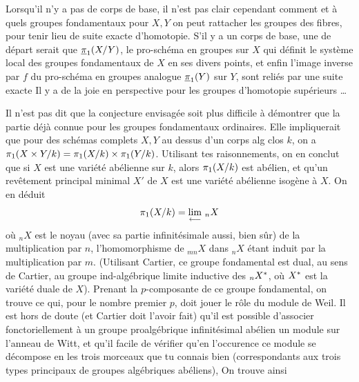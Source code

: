 Lorsqu'il n'y a pas de corps de base, il n'est pas clair cependant
comment et à quels groupes fondamentaux  pour $X,Y$ on peut
rattacher  les groupes  des fibres,
pour tenir lieu de suite exacte d'homotopie. S'il y a un corps de
base, une   de départ serait que  $\underline\pi_1(X/Y)$, le pro-schéma en groupes  sur $X$ qui définit le système
local des groupes fondamentaux  de $X$ en ses divers points,
et enfin l'image inverse par $f$ du pro-schéma en groupes analogue $\underline{\pi}_1(Y)$
sur $Y$, sont reliés par une suite exacte   Il y a de
la joie en perspective pour les groupes d'homotopie supérieurs \ldots

Il n'est pas dit que la conjecture envisagée soit plus difficile
à démontrer que la partie déjà connue pour les groupes fondamentaux
ordinaires. Elle impliquerait que pour des schémas complets $X,Y$ au
dessus d'un corps alg clos $k$, on a $\pi_1(X\times Y/k)=\pi_1(X/k)\times\pi_1(Y/k)$.
Utilisant tes raisonnements, on en conclut que si $X$ est une
variété abélienne sur $k$, alors $\pi_1(X/k)$ est abélien, et qu'un
revêtement principal minimal $X'$ de $X$ est une variété abélienne isogène à $X$. On en déduit
\[
\handwritten{\pi}_1(X/k)=\underset{\handwritten{\longleftarrow}}{\lim}\ {}_nX
\]
où ${}_nX$ est le noyau (avec sa partie infinitésimale aussi, bien sûr)
de la multiplication par $n$, l'homomorphisme de ${}_{mn}X$ dans ${}_nX$ étant
induit par la multiplication par $m$. (Utilisant Cartier, ce groupe
fondamental est dual, au sens de Cartier, au groupe ind-algébrique
limite inductive des ${}_nX^{*}$, où $X^{*}$ est la variété duale de $X$).
Prenant la $p$-composante de ce groupe fondamental, on trouve ce qui,
pour le nombre premier $p$, doit jouer le rôle du module de Weil. Il
est hors de doute (et Cartier doit l'avoir fait) qu'il est possible
d'associer  fonctoriellement à un groupe proalgébrique infinitésimal abélien un module sur l'anneau de Witt, et  qu'il 
facile de vérifier qu'en l'occurence ce module se décompose en les
trois morceaux que tu connais bien (correspondants aux trois types
principaux de groupes algébriques abéliens),  On trouve ainsi

